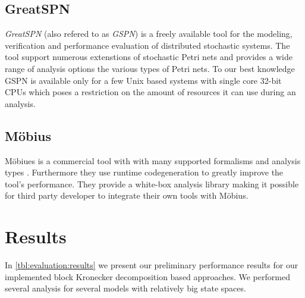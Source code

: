 \subsection{GreatSPN}

\emph{GreatSPN} (also refered to as \emph{GSPN}) \citep{baarir2009greatspn} is a freely available tool for the modeling, verification and performance evaluation of distributed stochastic systems. The tool support numerous extenstions of stochastic Petri nets and provides a wide range of analysis options the various types of Petri nets. To our best knowledge GSPN is available only for a few Unix based systems with single core 32-bit CPUs which poses a restriction on the amount of resources it can use during an analysis.

\subsection{Möbius}

Möbiues is a commercial tool with with many supported formalisms and analysis types \citep{courtney2009mobius}. Furthermore they use runtime codegeneration to greatly improve the tool's performance. They provide a white-box analysis library making it possible for third party developer to integrate their own tools with Möbius.

\section{Results}
\label{sec:evaluation:results}

In \cref{tbl:evaluation:results} we present our preliminary performance results for our implemented block Kronecker decomposition based approaches. We performed several analysis for several models with relatively big state spaces. 


